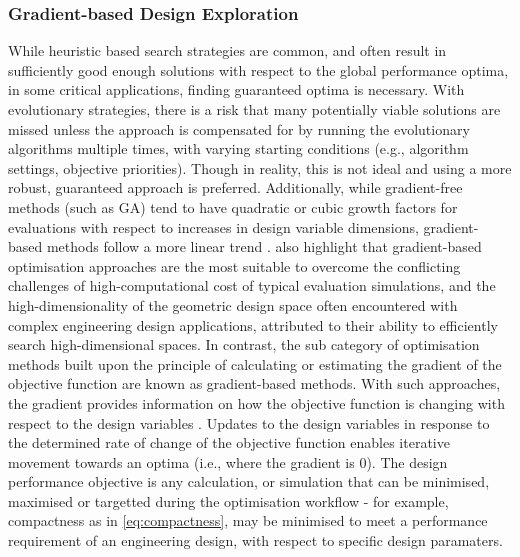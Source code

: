 \documentclass{article}
\begin{document}
\subsubsection{Gradient-based Design Exploration}
While heuristic based search strategies are common, and often result in sufficiently good enough solutions with respect to the global performance optima, in some critical applications, finding guaranteed optima is necessary. With evolutionary strategies, there is a risk that many potentially viable solutions are missed unless the approach is compensated for by running the evolutionary algorithms multiple times, with varying starting conditions (e.g., algorithm settings, objective priorities). Though in reality, this is not ideal and using a more robust, guaranteed approach is preferred. Additionally, while gradient-free methods (such as GA) tend to have quadratic or cubic growth factors for evaluations with respect to increases in design variable dimensions, gradient-based methods follow a more linear trend \citep{Li2022}. \cite{Li2022} also highlight that gradient-based optimisation approaches are the most suitable to overcome the conflicting challenges of high-computational cost of typical evaluation simulations, and the high-dimensionality of the geometric design space often encountered with complex engineering design applications, attributed to their ability to efficiently search high-dimensional spaces.
In contrast, the sub category of optimisation methods built upon the principle of calculating or estimating the gradient of the objective function are known as gradient-based methods. With such approaches, the gradient provides information on how the objective function is changing with respect to the design variables \citep{Brown:2018:2518-6582:1}. Updates to the design variables in response to the determined rate of change of the objective function enables iterative movement towards an optima (i.e., where the gradient is 0). The design performance objective is any calculation, or simulation that can be minimised, maximised or targetted during the optimisation workflow - for example, compactness as in \eqref{eq:compactness}, may be minimised to meet a performance requirement of an engineering design, with respect to specific design paramaters.
\end{document}
